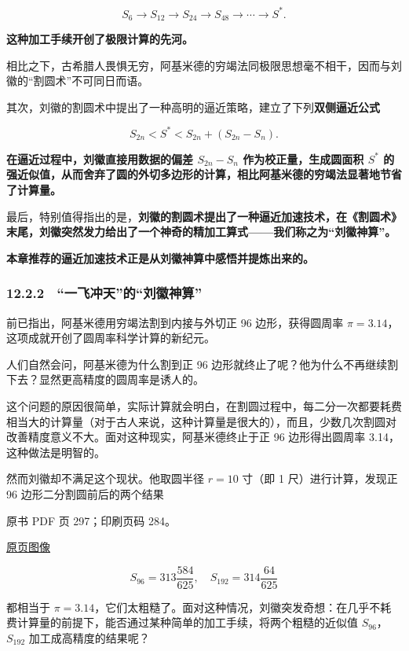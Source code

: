 \[
S_6\to S_{12}\to S_{24}\to S_{48}\to\cdots\to S^*.
\]

\textbf{这种加工手续开创了极限计算的先河。}

相比之下，古希腊人畏惧无穷，阿基米德的穷竭法同极限思想毫不相干，因而与刘徽的``割圆术''不可同日而语。

其次，刘徽的割圆术中提出了一种高明的逼近策略，建立了下列\textbf{双侧逼近公式}

\[
S_{2n}<S^*<S_{2n}+(S_{2n}-S_n).
\]

\textbf{在逼近过程中，刘徽直接用数据的偏差 \(S_{2n}-S_n\) 作为校正量，生成圆面积 \(S^*\) 的强近似值，从而舍弃了圆的外切多边形的计算，相比阿基米德的穷竭法显著地节省了计算量。}

最后，特别值得指出的是，\textbf{刘徽的割圆术提出了一种逼近加速技术，在《割圆术》末尾，刘徽突然发力给出了一个神奇的精加工算式------我们称之为``刘徽神算''。}

\textbf{本章推荐的逼近加速技术正是从刘徽神算中感悟并提炼出来的。}

\subsubsection{12.2.2　``一飞冲天''的``刘徽神算''}\label{ch12-ux4e00ux98deux51b2ux5929ux7684ux5218ux5fbdux795eux7b97}

前已指出，阿基米德用穷竭法割到内接与外切正 96 边形，获得圆周率 \(\pi=3.14\)，这项成就开创了圆周率科学计算的新纪元。

人们自然会问，阿基米德为什么割到正 96 边形就终止了呢？他为什么不再继续割下去？显然更高精度的圆周率是诱人的。

这个问题的原因很简单，实际计算就会明白，在割圆过程中，每二分一次都要耗费相当大的计算量（对于古人来说，这种计算量是很大的），而且，少数几次割圆对改善精度意义不大。面对这种现实，阿基米德终止于正 96 边形得出圆周率 3.14，这种做法是明智的。

然而刘徽却不满足这个现状。他取圆半径 \(r=10\) 寸（即 1 尺）进行计算，发现正 96 边形二分割圆前后的两个结果

\clearpage

原书 PDF 页 297；印刷页码 284。

\href{source-images/pdf-297.jpeg}{原页图像}

\[
S_{96}=313\frac{584}{625},\quad S_{192}=314\frac{64}{625}
\]

都相当于 \(\pi=3.14\)，它们太粗糙了。面对这种情况，刘徽突发奇想：在几乎不耗费计算量的前提下，能否通过某种简单的加工手续，将两个粗糙的近似值 \(S_{96}\)，\(S_{192}\) 加工成高精度的结果呢？


